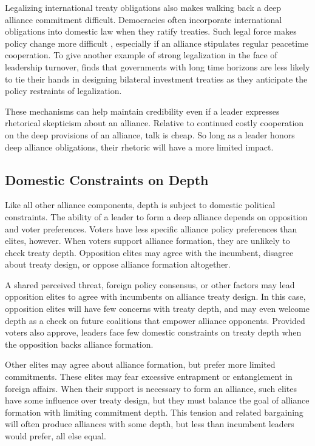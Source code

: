 \documentclass[12pt]{article}
\begin{document}
Legalizing international treaty obligations also makes walking back a deep alliance commitment difficult. 
Democracies often incorporate international obligations into domestic law when they ratify treaties.
Such legal force makes policy change more difficult \citep{Gaubatz1996, Leedsetal2009}, especially if an alliance stipulates regular peacetime cooperation. 
To give another example of strong legalization in the face of leadership turnover, \citet{Blake2013} finds that governments with long time horizons are less likely to tie their hands in designing bilateral investment treaties as they anticipate the policy restraints of legalization. 


These mechanisms can help maintain credibility even if a leader expresses rhetorical skepticism about an alliance. 
Relative to continued costly cooperation on the deep provisions of an alliance, talk is cheap. 
So long as a leader honors deep alliance obligations, their rhetoric will have a more limited impact. 



\subsection{Domestic Constraints on Depth} 

Like all other alliance components, depth is subject to domestic political constraints. 
The ability of a leader to form a deep alliance depends on opposition and voter preferences.
Voters have less specific alliance policy preferences than elites, however. 
When voters support alliance formation, they are unlikely to check treaty depth.
Opposition elites may agree with the incumbent, disagree about treaty design, or oppose alliance formation altogether. 


A shared perceived threat, foreign policy consensus, or other factors may lead opposition elites to agree with incumbents on alliance treaty design. 
In this case, opposition elites will have few concerns with treaty depth, and may even welcome depth as a check on future coalitions that empower alliance opponents. 
Provided voters also approve, leaders face few domestic constraints on treaty depth when the opposition backs alliance formation. 

Other elites may agree about alliance formation, but prefer more limited commitments. 
These elites may fear excessive entrapment or entanglement in foreign affairs. 
When their support is necessary to form an alliance, such elites have some influence over treaty design, but they must balance the goal of alliance formation with limiting commitment depth.
This tension and related bargaining will often produce alliances with some depth, but less than incumbent leaders would prefer, all else equal.  
\end{document}
